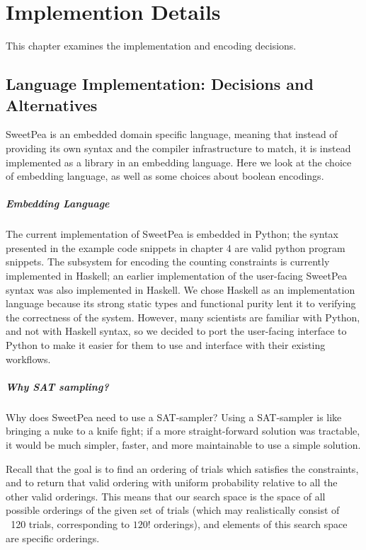 
\chapter{Implemention Details}

This chapter examines the implementation and encoding decisions.

\section{Language Implementation: Decisions and Alternatives}

SweetPea is an embedded domain specific language, meaning that instead of providing its own syntax and the compiler infrastructure to match, it is instead implemented as a library in an embedding language. Here we look at the choice of embedding language, as well as some choices about boolean encodings.

\paragraph*{Embedding Language}

The current implementation of SweetPea is embedded in Python; the syntax presented in the example code snippets in chapter 4 are valid python program snippets. The subsystem for encoding the counting constraints is currently implemented in Haskell; an earlier implementation of the user-facing SweetPea syntax was also implemented in Haskell. We chose Haskell as an implementation language because its strong static types and functional purity lent it to verifying the correctness of the system. However, many scientists are familiar with Python, and not with Haskell syntax, so we decided to port the user-facing interface to Python to make it easier for them to use and interface with their existing workflows.

\paragraph*{Why SAT sampling?}

Why does SweetPea need to use a SAT-sampler? Using a SAT-sampler is like bringing a nuke to a knife fight; if a more straight-forward solution was tractable, it would be much simpler, faster, and more maintainable to use a simple solution.

Recall that the goal is to find an ordering of trials which satisfies the constraints, and to return that valid ordering with uniform probability relative to all the other valid orderings. This means that our search space is the space of all possible orderings of the given set of trials (which may realistically consist of \texttt{~}120 trials, corresponding to $120!$ orderings), and elements of this search space are specific orderings.

